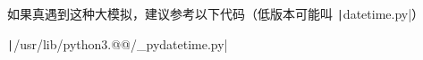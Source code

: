 如果真遇到这种大模拟，建议参考以下代码（低版本可能叫 \texttt|datetime.py|）

\texttt|/usr/lib/python3.@{\color{red}{XX}}@/_pydatetime.py|
